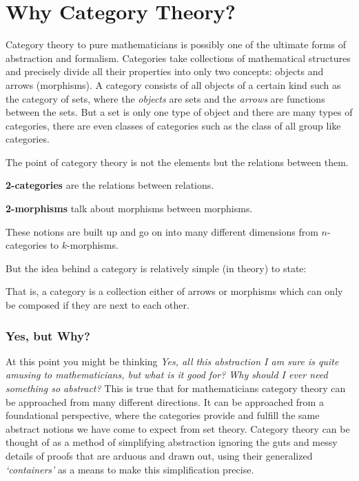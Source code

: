 \section{Why Category Theory?}

Category theory to pure mathematicians is possibly one of the ultimate forms of abstraction and formalism. Categories take collections of mathematical structures and precisely divide all their properties into only two concepts: objects and arrows (morphisms). A category consists of all objects of a certain kind such as the category of sets, where the \emph{objects} are sets and the \emph{arrows} are functions between the sets. But a set is only one type of object and there are many types of categories, there are even classes of categories such as the class of all group like categories. 

The point of category theory is not the elements but the relations between them. 

\begin{description}
\item \textbf{2-categories} are the relations between relations.
\item \textbf{2-morphisms} talk about morphisms between morphisms. 
\item These notions are built up and go on into many different dimensions from $n$-categories to $k$-morphisms.
\end{description}

But the idea behind a category is relatively simple (in theory) to state: 

That is, a category is a collection either of arrows or morphisms which can only be composed if they are next to each other. 


\subsubsection{Yes, but Why?}

At this point you might be thinking \emph{Yes, all this abstraction I am sure is quite amusing to mathematicians, but what is it good for? Why should I ever need something so abstract?} 
This is true that for mathematicians category theory can be approached from many different directions. It can be approached from a foundational perspective, where the categories provide and fulfill the same abstract notions we have come to expect from set theory. Category theory can be thought of as a method of simplifying abstraction ignoring the guts and messy details of proofs that are arduous and drawn out, using their generalized \emph{`containers'} as a means to make this simplification precise. 


